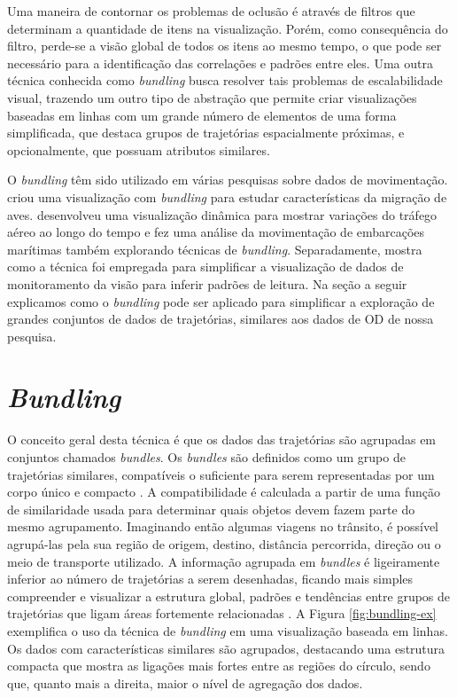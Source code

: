Uma maneira de contornar os problemas de oclusão é através de filtros que determinam
a quantidade de itens na visualização. Porém, como consequência do filtro, perde-se a visão
global de todos os itens ao mesmo tempo, o que pode ser necessário para a identificação das
correlações e padrões entre eles. Uma outra técnica conhecida como \emph{bundling} busca resolver
tais problemas de escalabilidade visual, trazendo um outro tipo de abstração que permite
criar visualizações baseadas em linhas com um grande número de elementos de uma forma simplificada,
que destaca grupos de trajetórias espacialmente próximas, e opcionalmente, que possuam atributos similares.

O \emph{bundling} têm sido utilizado em várias pesquisas sobre dados de movimentação.
\citep{Anita2017} criou uma visualização com \emph{bundling} para estudar características da migração de aves.
\citep{Klein2014} desenvolveu uma visualização dinâmica para mostrar variações do tráfego aéreo ao longo do tempo e
\citep{Willems2009} fez uma análise da movimentação de embarcações marítimas também explorando
técnicas de \emph{bundling}. Separadamente, \citep{Blascheck2017} mostra como a técnica foi
empregada para simplificar a visualização de dados de monitoramento da visão para inferir padrões de leitura. 
Na seção a seguir explicamos como o \emph{bundling} pode ser aplicado para simplificar a exploração
de grandes conjuntos de dados de trajetórias, similares aos dados de OD de nossa pesquisa.

\section{\emph{Bundling}}
\label{sec:bundling}

O conceito geral desta técnica é que os dados das trajetórias são agrupadas em
conjuntos chamados \emph{bundles}. Os \emph{bundles} são definidos como um grupo
de trajetórias similares, compatíveis o suficiente para serem representadas por
um corpo único e compacto \citep{Lhuillier2017}. A compatibilidade é calculada a
partir de uma função de similaridade usada para determinar quais objetos devem
fazem parte do mesmo agrupamento. Imaginando então algumas viagens no trânsito,
é possível agrupá-las pela sua região de origem, destino, distância percorrida,
direção ou o meio de transporte utilizado. A informação agrupada em
\emph{bundles} é ligeiramente inferior ao número de trajetórias a serem
desenhadas, ficando mais simples compreender e visualizar a estrutura global,
padrões e tendências entre grupos de trajetórias que ligam áreas fortemente
relacionadas \citep{Zhou2013}. A Figura \ref{fig:bundling-ex} exemplifica o uso
da técnica de \emph{bundling} em uma visualização baseada em linhas. Os dados
com características similares são agrupados, destacando uma estrutura compacta
que mostra as ligações mais fortes entre as regiões do círculo, sendo que,
quanto mais a direita, maior o nível de agregação dos dados.

